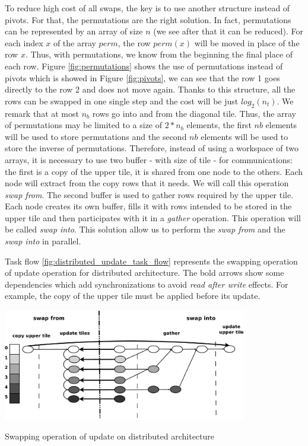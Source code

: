 To reduce high cost of all swaps, the key is to use another structure instead of pivots. For that, the permutations are the right solution. In fact, permutations can be represented by an array of size $n$ (we see after that it can be reduced). For each index $x$ of the array $perm$, the row $perm(x)$ will be moved in place of the row $x$. Thus, with permutations, we know from the beginning the final place of each row. 
Figure \ref{fig:permutations} shows the use of permutations instead of pivots which is showed in Figure \ref{fig:pivots}, we can see that the row 1 goes directly to the row 2 and does	 not move again.
Thanks to this structure, all the rows can be swapped in one single step and the cost will be just $log_2(n_t)$. 
We remark that at most $n_b$ rows go into and from the diagonal tile. Thus, the array of permutations may be limited to a size of $2*n_b$ elements, the first $nb$ elements will be used to store permutations and the second $nb$ elements will be used to store the inverse of permutations. Therefore, instead of using a workspace of two arrays, it is necessary to use two buffer - with size of tile - for communications: the first is a copy of the upper tile, it is shared from one node to the others. Each node will extract from the copy rows that it needs. We will call this operation \emph{swap from}. The second buffer is used to gather rows required by the upper tile. Each node creates its own buffer, fills it with rows intended to be stored in the upper tile and then participates with it in a \textit{gather} operation. This operation will be called \emph{swap into}. This solution allow us to perform the \emph{swap from} and the \emph{swap into} in parallel.

Task flow \ref{fig:distributed_update_task_flow} represents the swapping operation of update operation for distributed architecture. The bold arrows show some dependencies which add synchronizations to avoid \emph{read after write} effects. For example, the copy of the upper tile must be applied before its update.

\begin{taskflow}[!ht]
\centering
\includegraphics[width=0.8\textwidth]{figures/distributed_update_tf_bw.pdf}
\caption{Swapping operation of update on distributed architecture \label{fig:distributed_update_task_flow}}
\end{taskflow}


